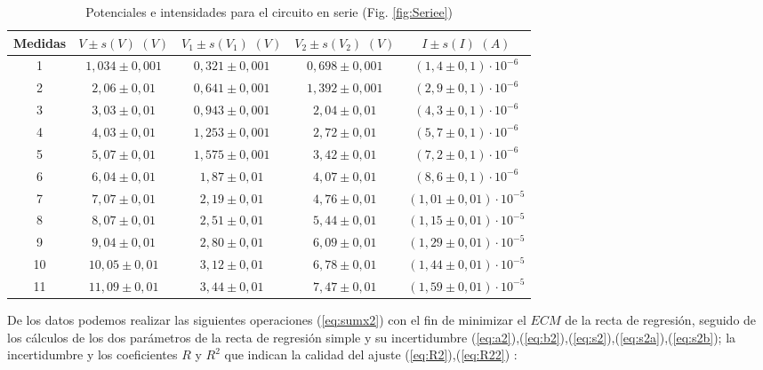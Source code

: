 \documentclass[11pt]{report}
\begin{document}
\begin{refsection}
\begin{table}[H]
\centering
\begin{tabular}{|c|c|c|c|c|}
\hline
Medidas &$V \pm s(V)\hspace{4pt}(V)$&$V_1 \pm s(V_1)\hspace{4pt}(V)$&$V_2 \pm s(V_2)\hspace{4pt}(V)$&$I \pm s(I)\hspace{4pt}(A)$\\
\hline
1 & $1,034 \pm 0,001$ &$0,321 \pm 0,001$& $0,698 \pm 0,001$ & $(1,4 \pm 0,1) \cdot 10^{-6}$ \\
2 & $2,06 \pm 0,01$ &$0,641 \pm 0,001$& $1,392 \pm 0,001$ & $(2,9 \pm 0,1) \cdot 10^{-6}$ \\
3 & $3,03 \pm 0,01$ &$0,943 \pm 0,001$& $2,04 \pm 0,01$ & $(4,3 \pm 0,1) \cdot 10^{-6}$ \\
4 & $4,03 \pm 0,01$ &$1,253 \pm 0,001$& $2,72 \pm 0,01$ & $(5,7 \pm 0,1) \cdot 10^{-6}$ \\
5 & $5,07 \pm 0,01$ &$1,575 \pm 0,001$& $3,42 \pm 0,01$ & $(7,2 \pm 0,1) \cdot 10^{-6}$ \\
6 & $6,04 \pm 0,01$ &$1,87 \pm 0,01$& $4,07 \pm 0,01$ & $(8,6 \pm 0,1) \cdot 10^{-6}$ \\
7 & $7,07 \pm 0,01$ &$2,19 \pm 0,01$& $4,76 \pm 0,01$ & $(1,01 \pm 0,01) \cdot 10^{-5}$ \\
8 & $8,07 \pm 0,01$ &$2,51 \pm 0,01$& $5,44 \pm 0,01$ & $(1,15 \pm 0,01) \cdot 10^{-5}$ \\
9 & $9,04 \pm 0,01$ &$2,80 \pm 0,01$& $6,09 \pm 0,01$ & $(1,29 \pm 0,01) \cdot 10^{-5}$ \\
10 & $10,05 \pm 0,01$ &$3,12 \pm 0,01$& $6,78 \pm 0,01$ & $(1,44 \pm 0,01) \cdot 10^{-5}$ \\
11 & $11,09 \pm 0,01$ &$3,44 \pm 0,01$& $7,47 \pm 0,01$ & $(1,59 \pm 0,01) \cdot 10^{-5}$ \\
\hline
\end{tabular}
\caption{Potenciales e intensidades para el circuito en serie (Fig. \ref{fig:Seriee})}
\label{tab:Serie}
\end{table}

De los datos podemos realizar las siguientes operaciones (\ref{eq:sumx2}) 
con el fin de minimizar el $ECM$ de la recta de regresión, seguido de los cálculos de los dos parámetros de la 
recta de regresión simple y su incertidumbre (\ref{eq:a2}),(\ref{eq:b2}),(\ref{eq:s2}),(\ref{eq:s2a}),(\ref{eq:s2b});
la incertidumbre y los coeficientes $R$ y $R^2$ que indican la calidad del ajuste (\ref{eq:R2}),(\ref{eq:R22}) :


\end{refsection}
\end{document}

